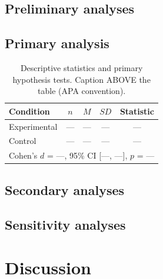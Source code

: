 \documentclass[11pt,a4paper]{article}
\begin{document}
\subsection{Preliminary analyses}

\subsection{Primary analysis}

\begin{table}[t]
\caption{Descriptive statistics and primary hypothesis tests. Caption ABOVE the table (APA convention).}
\label{tab:primary}
\centering
\begin{tabular}{lcccc}
\toprule
Condition & $n$ & $M$ & $SD$ & Statistic \\
\midrule
Experimental & --- & --- & --- & --- \\
Control      & --- & --- & --- & --- \\
\multicolumn{5}{l}{Cohen's $d$ = ---, 95\% CI [---, ---], $p$ = ---} \\
\bottomrule
\end{tabular}
\end{table}

\subsection{Secondary analyses}

\subsection{Sensitivity analyses}

\section{Discussion}
\label{sec:discussion}
\end{document}

